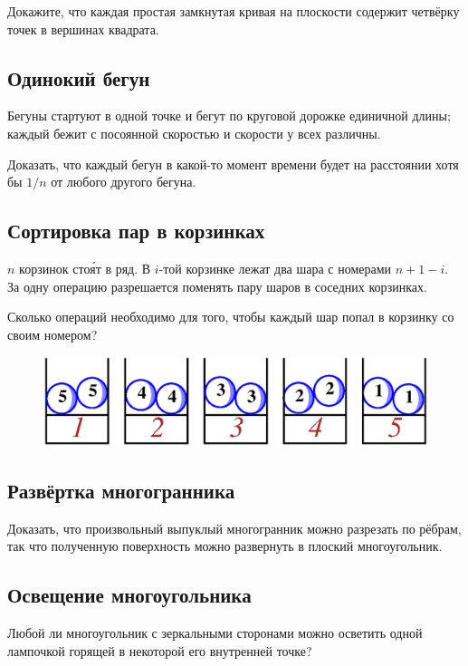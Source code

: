 Докажите, что каждая простая замкнутая кривая на плоскости содержит четвёрку точек в вершинах квадрата.

\subsection*{Одинокий бегун}

Бегуны  стартуют в одной точке и бегут по круговой дорожке единичной длины;
каждый бежит с посоянной скоростью и скорости у всех различны.

Доказать, что каждый бегун в какой-то момент времени будет на расстоянии хотя бы $1/n$ от любого другого бегуна.

\subsection*{Сортировка пар в корзинках}

$n$ корзинок сто\'{я}т в ряд.
В $i$-той корзинке лежат два шара с номерами $n+1-i$.
За одну операцию разрешается поменять пару шаров в соседних корзинках.

Сколько операций необходимо для того, чтобы каждый шар попал в корзинку со своим номером?

\begin{figure}[h!]
\centering
\includegraphics[scale=0.5]{Figs/UnsolvedPuzzles/bins}
\end{figure}

\subsection*{Развёртка многогранника}

Доказать, что произвольный выпуклый многогранник можно разрезать по рёбрам, так что полученную поверхность можно развернуть в плоский многоугольник.

\subsection*{Освещение многоугольника}

Любой ли многоугольник с зеркальными сторонами можно осветить одной лампочкой горящей в некоторой его внутренней точке?

